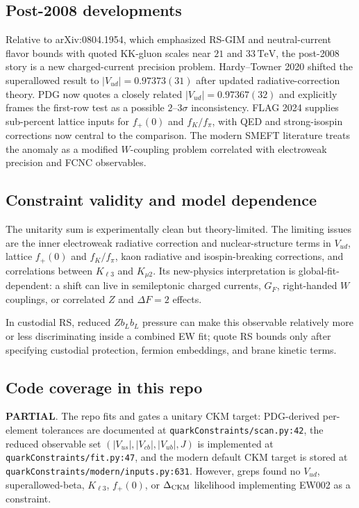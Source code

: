 \subsection*{Post-2008 developments}
Relative to arXiv:0804.1954, which emphasized RS-GIM and neutral-current
flavor bounds with quoted KK-gluon scales near \(21\) and \(33\,\mathrm{TeV}\),
the post-2008 story is a new charged-current precision problem.  Hardy--Towner
2020 shifted the superallowed result to \(|V_{ud}|=0.97373(31)\) after updated
radiative-correction theory.  PDG now quotes a closely related
\(|V_{ud}|=0.97367(32)\) and explicitly frames the first-row test as a possible
\(2\)--\(3\sigma\) inconsistency.  FLAG 2024 supplies sub-percent lattice inputs
for \(f_+(0)\) and \(f_K/f_\pi\), with QED and strong-isospin corrections now
central to the comparison.  The modern SMEFT literature treats the anomaly as a
modified \(W\)-coupling problem correlated with electroweak precision and FCNC
observables.

\subsection*{Constraint validity and model dependence}
The unitarity sum is experimentally clean but theory-limited.  The limiting
issues are the inner electroweak radiative correction and nuclear-structure
terms in \(V_{ud}\), lattice \(f_+(0)\) and \(f_K/f_\pi\), kaon radiative and
isospin-breaking corrections, and correlations between \(K_{\ell3}\) and
\(K_{\mu2}\).  Its new-physics interpretation is global-fit-dependent: a shift
can live in semileptonic charged currents, \(G_F\), right-handed \(W\) couplings,
or correlated \(Z\) and \(\Delta F=2\) effects.

In custodial RS, reduced \(Z b_L b_L\) pressure can make this observable
relatively more or less discriminating inside a combined EW fit; quote RS
bounds only after specifying custodial protection, fermion embeddings, and
brane kinetic terms.

\subsection*{Code coverage in this repo}
\textbf{PARTIAL}.  The repo fits and gates a unitary CKM target: PDG-derived
per-element tolerances are documented at \texttt{quarkConstraints/scan.py:42},
the reduced observable set \((|V_{us}|,|V_{cb}|,|V_{ub}|,J)\) is implemented at
\texttt{quarkConstraints/fit.py:47}, and the modern default CKM target is stored
at \texttt{quarkConstraints/modern/inputs.py:631}.  However, greps found no
\(V_{ud}\), superallowed-beta, \(K_{\ell3}\), \(f_+(0)\), or
\(\Delta_{\rm CKM}\) likelihood implementing EW002 as a constraint.

